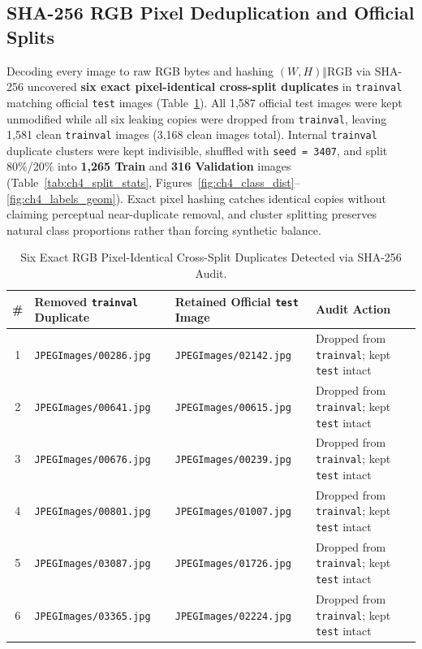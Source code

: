 \subsection{SHA-256 RGB Pixel Deduplication and Official Splits}

Decoding every image to raw RGB bytes and hashing $(W, H) \Vert \text{RGB}$ via SHA-256 uncovered \textbf{six exact pixel-identical cross-split duplicates} in \texttt{trainval} matching official \texttt{test} images (Table~\ref{tab:ch4_duplicates}). All 1,587 official test images were kept unmodified while all six leaking copies were dropped from \texttt{trainval}, leaving 1,581 clean \texttt{trainval} images (3,168 clean images total). Internal \texttt{trainval} duplicate clusters were kept indivisible, shuffled with \texttt{seed = 3407}, and split 80\%/20\% into \textbf{1,265 Train} and \textbf{316 Validation} images (Table~\ref{tab:ch4_split_stats}, Figures~\ref{fig:ch4_class_dist}--\ref{fig:ch4_labels_geom}). Exact pixel hashing catches identical copies without claiming perceptual near-duplicate removal, and cluster splitting preserves natural class proportions rather than forcing synthetic balance.

\begin{table}[htbp]
\centering
\caption{Six Exact RGB Pixel-Identical Cross-Split Duplicates Detected via SHA-256 Audit.}
\label{tab:ch4_duplicates}
\footnotesize
\renewcommand{\arraystretch}{1.10}
\begin{tabularx}{\textwidth}{|c|l|l|X|}
\hline
\rowcolor{slatehdr}
\textbf{\#} & \textbf{Removed \texttt{trainval} Duplicate} & \textbf{Retained Official \texttt{test} Image} & \textbf{Audit Action} \\
\hline
1 & \nolinkurl{JPEGImages/00286.jpg} & \nolinkurl{JPEGImages/02142.jpg} & Dropped from \texttt{trainval}; kept \texttt{test} intact \\ \hline
2 & \nolinkurl{JPEGImages/00641.jpg} & \nolinkurl{JPEGImages/00615.jpg} & Dropped from \texttt{trainval}; kept \texttt{test} intact \\ \hline
3 & \nolinkurl{JPEGImages/00676.jpg} & \nolinkurl{JPEGImages/00239.jpg} & Dropped from \texttt{trainval}; kept \texttt{test} intact \\ \hline
4 & \nolinkurl{JPEGImages/00801.jpg} & \nolinkurl{JPEGImages/01007.jpg} & Dropped from \texttt{trainval}; kept \texttt{test} intact \\ \hline
5 & \nolinkurl{JPEGImages/03087.jpg} & \nolinkurl{JPEGImages/01726.jpg} & Dropped from \texttt{trainval}; kept \texttt{test} intact \\ \hline
6 & \nolinkurl{JPEGImages/03365.jpg} & \nolinkurl{JPEGImages/02224.jpg} & Dropped from \texttt{trainval}; kept \texttt{test} intact \\ \hline
\end{tabularx}
\end{table}

